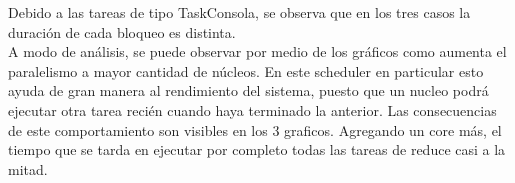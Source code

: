 \indent Debido a las tareas de tipo TaskConsola, se observa que en los tres casos la duración 
de cada bloqueo es distinta.\\
\indent A modo de análisis, se puede observar por medio de los gráficos como aumenta el paralelismo a mayor cantidad de núcleos. 
En este scheduler en particular esto ayuda de gran manera al rendimiento del sistema, puesto que un nucleo podrá ejecutar otra tarea 
recién cuando haya terminado la anterior. Las consecuencias de este comportamiento son visibles en los 3 graficos. Agregando un core más, 
el tiempo que se tarda en ejecutar por completo todas las tareas de reduce casi a la mitad.\\